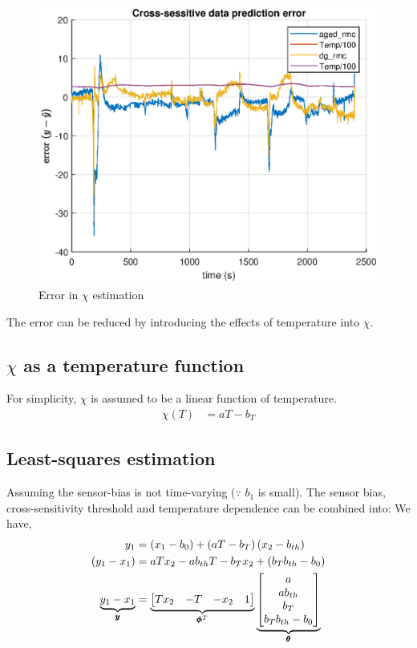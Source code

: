 \begin{figure}[H]
    \centering
    \includegraphics[width = 0.5 \textwidth]{./figs/chi_est/chi_error.eps}
    \caption{Error in $\chi$ estimation}
\end{figure}

The error can be reduced by introducing the effects of temperature into $\chi$.


\subsection{$\chi$ as a temperature function}
For simplicity, $\chi$ is assumed to be a linear function of temperature.
\begin{align*}
    \chi(T) &= a T - b_T
\end{align*}

\subsection{Least-squares estimation}
Assuming the sensor-bias is not time-varying ($\because$ $b_1$ is small). The
sensor bias, cross-sensitivity threshold and temperature dependence can be
combined into:
We have,
\begin{align*}
    y_1 &=  \left( x_1 - b_0 \right) + \left( aT - b_{T} \right) \left( x_2 - b_{th} \right)\\
    \left( y_1 - x_1 \right) &= a T x_2 - a b_{th} T - b_{T} x_2 + (b_T b_{th} - b_0)\\
    \underbrace{y_1 - x_1}_{\pmb y} &= \underbrace{\begin{bmatrix} T x_2 & -T & -x_2 & 1 \end{bmatrix}}_{\pmb \phi^T} \underbrace{\begin{bmatrix} a \\ a b_{th} \\ b_T \\ b_T b_{th} - b_0 \end{bmatrix}}_{\pmb \theta}\\
\end{align*}

